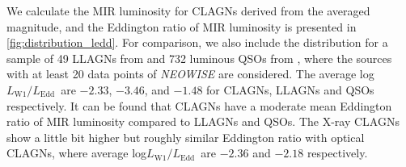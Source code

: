 \documentclass[linenumbers]{aastex631}
\begin{document}
We calculate the MIR luminosity for CLAGNs derived from the averaged magnitude, and the Eddington ratio of MIR luminosity is presented in \autoref{fig:distribution_ledd}. For comparison, we also include the distribution for a sample of 49 LLAGNs from \citet{2009MNRAS.399..349G} and 732 luminous QSOs from \citet{2007ApJ...667..131G}, where the sources with at least 20 data points of \textit{NEOWISE} are considered. The average log$L_\mathrm{W1}/L_\mathrm{Edd}$\, are $-2.33$, $-3.46$, and $-1.48$ for CLAGNs, LLAGNs and QSOs respectively. It can be found that CLAGNs have a moderate mean Eddington ratio of MIR luminosity compared to LLAGNs and QSOs. The X-ray CLAGNs show a little bit higher but roughly similar Eddington ratio with optical CLAGNs, where average log$L_\mathrm{W1}/L_\mathrm{Edd}$\ are $-2.36$ and $-2.18$ respectively.     
 
\end{document}
